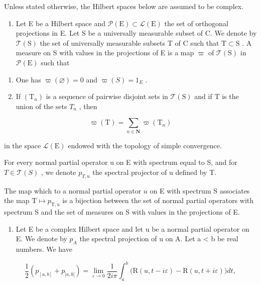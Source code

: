 \exercisesection{}

Unless stated otherwise, the Hilbert spaces below are assumed to be complex.

\begin{enumerate}
\def\labelenumi{\arabic{enumi})}
\tightlist
\item
  Let E be a Hilbert space and \(\mathcal{P}(\mathrm{E})\subset \mathcal{L}(\mathrm{E})\) the set of orthogonal projections in E. Let S be a universally measurable subset of C. We denote by \(\mathcal{T}(\mathrm{S})\) the set of universally measurable subsets T of C such that \(\mathrm{T}\subset \mathrm{S}\) . A measure on S with values in the projections of E is a map \(\varpi\) of \(\mathcal{T}(\mathrm{S})\) in \(\mathcal{P}(\mathrm{E})\) such that
\end{enumerate}

\begin{enumerate}
\def\labelenumi{(\roman{enumi})}
\item
  One has \(\varpi(\varnothing)=0\) and \(\varpi(S)=1_{E}\) .
\item
  If \((\mathrm{T}_{n})\) is a sequence of pairwise disjoint sets in \(\mathcal{T}(\mathrm{S})\) and if T is the union of the sets \(T_{n}\) , then
\end{enumerate}

\[
\varpi (\mathrm{T}) = \sum_ {n \in \mathbf {N}} \varpi (\mathrm{T} _ {n})
\]

in the space \(\mathcal{L}(\mathrm{E})\) endowed with the topology of simple convergence.

For every normal partial operator u on E with spectrum equal to S, and for \(T \in \mathcal{T}(S)\) , we denote \(p_{T,u}\) the spectral projector of u defined by T.

The map which to a normal partial operator \(u\) on E with spectrum S associates the map \(\mathrm{T} \mapsto p_{\mathrm{T}, u}\) is a bijection between the set of normal partial operators with spectrum S and the set of measures on S with values in the projections of E.

\begin{enumerate}
\def\labelenumi{\arabic{enumi})}
\setcounter{enumi}{1}
\tightlist
\item
  Let E be a complex Hilbert space and let u be a normal partial operator on E. We denote by \(p_{A}\) the spectral projection of u on A. Let a \textless{} b be real numbers. We have
\end{enumerate}

\[
\frac {1}{2} (p _ {[ a, b ]} + p _ {] a, b [}) = \lim _ {\varepsilon \rightarrow 0} \frac {1}{2 i \pi} \int_ {a} ^ {b} \big (\mathrm{R} (u, t - i \varepsilon) - \mathrm{R} (u, t + i \varepsilon) \big) d t,
\]

